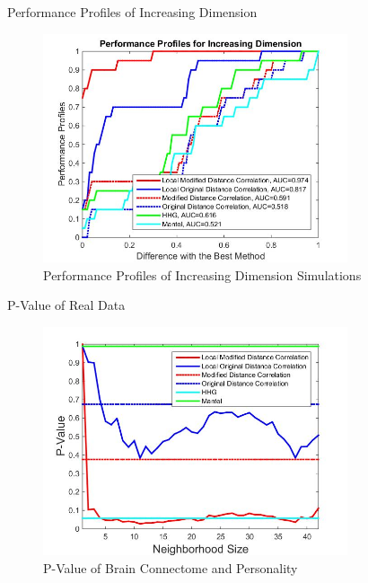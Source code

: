 \documentclass{beamer}
\begin{document}
\begin{frame}{Performance Profiles of Increasing Dimension}
\begin{figure}[ht]
  \centering
  \includegraphics[width=0.8\textwidth]{Fig7.jpg}
	\caption{Performance Profiles of Increasing Dimension Simulations}
\end{figure} 
\end{frame}

\begin{frame}{P-Value of Real Data}
\begin{figure}[ht]
  \centering
  \includegraphics[width=0.8\textwidth]{FigReal1.jpg}
	\caption{P-Value of Brain Connectome and Personality}
\end{figure}
\end{frame}
\end{document}
